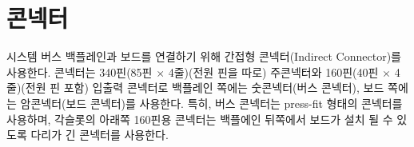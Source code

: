 \section{콘넥터}
시스템 버스 백플레인과 보드를 연결하기 위해 간접형 콘넥터(Indirect Connector)를 사용한다.
콘넥터는 340핀(85핀 $\times$ 4줄)(전원 핀을 따로) 주콘넥터와
160핀(40핀 $\times$ 4줄)(전원 핀 포함) 입출력 콘넥터로 백플레인 쪽에는 
숫콘넥터(버스 콘넥터), 보드 쪽에는 암콘넥터(보드 콘넥터)를 사용한다.
특히, 버스 콘넥터는 press-fit 형태의 콘넥터를 사용하며,
각슬롯의 아래쪽 160핀용 콘넥터는 백플에인 뒤쪽에서 보드가 설치
될 수 있도록 다리가 긴 콘넥터를 사용한다.
%
